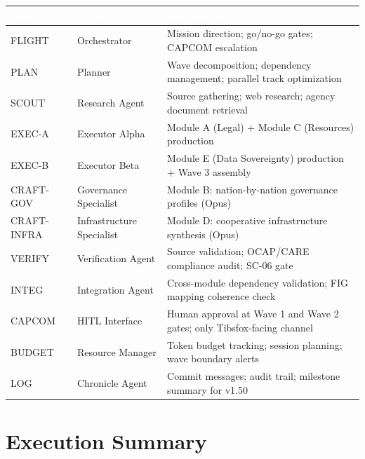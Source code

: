 \documentclass[11pt,letterpaper]{article}
\newcommand{\tableheader}[1]{\textbf{\sffamily\textcolor{white}{#1}}}
\begin{document}
\begin{center}
\begin{tabularx}{\textwidth}{L{2cm}L{2.5cm}X}
\toprule
{}
\tableheader{Role} & \tableheader{Agent} & \tableheader{Responsibility} \\
\midrule
FLIGHT & Orchestrator & Mission direction; go/no-go gates; CAPCOM escalation \\
PLAN & Planner & Wave decomposition; dependency management; parallel track optimization \\
SCOUT & Research Agent & Source gathering; web research; agency document retrieval \\
EXEC-A & Executor Alpha & Module A (Legal) + Module C (Resources) production \\
EXEC-B & Executor Beta & Module E (Data Sovereignty) production + Wave 3 assembly \\
CRAFT-GOV & Governance Specialist & Module B: nation-by-nation governance profiles (Opus) \\
CRAFT-INFRA & Infrastructure Specialist & Module D: cooperative infrastructure synthesis (Opus) \\
VERIFY & Verification Agent & Source validation; OCAP/CARE compliance audit; SC-06 gate \\
INTEG & Integration Agent & Cross-module dependency validation; FIG mapping coherence check \\
CAPCOM & HITL Interface & Human approval at Wave 1 and Wave 2 gates; only Tibsfox-facing channel \\
BUDGET & Resource Manager & Token budget tracking; session planning; wave boundary alerts \\
LOG & Chronicle Agent & Commit messages; audit trail; milestone summary for v1.50 \\
\bottomrule
\end{tabularx}
\end{center}

\section{Execution Summary}
\end{document}
